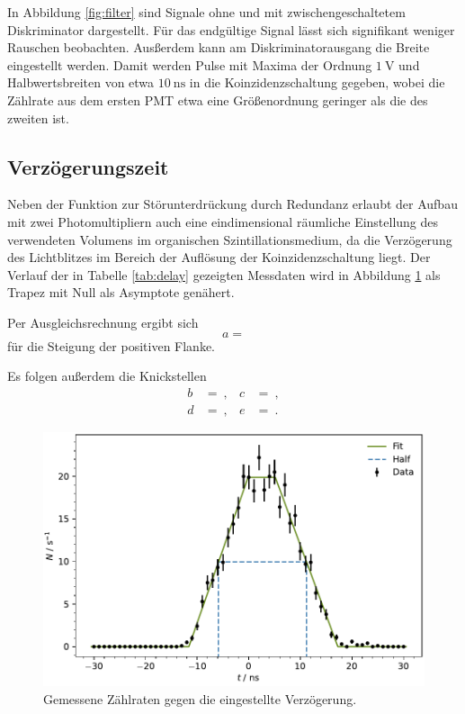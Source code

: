 In Abbildung \ref{fig:filter} sind Signale ohne und mit zwischengeschaltetem Diskriminator dargestellt. Für das endgültige Signal
lässt sich signifikant weniger Rauschen beobachten. Ausßerdem kann am Diskriminatorausgang die Breite eingestellt werden. Damit
werden Pulse mit Maxima der Ordnung $\qty{1}{\volt}$ und Halbwertsbreiten von etwa $\qty{10}{\nano\second}$ in die
Koinzidenzschaltung gegeben, wobei die Zählrate aus dem ersten PMT etwa eine Größenordnung geringer als die des
zweiten ist.



\subsection{Verzögerungszeit}

Neben der Funktion zur Störunterdrückung durch Redundanz erlaubt der Aufbau mit zwei Photomultipliern auch eine eindimensional
räumliche Einstellung des verwendeten Volumens im organischen Szintillationsmedium, da die Verzögerung des Lichtblitzes im Bereich
der Auflösung der Koinzidenzschaltung liegt. Der Verlauf der in Tabelle \ref{tab:delay} gezeigten Messdaten wird in Abbildung
\ref{fig:delay} als Trapez mit Null als Asymptote genähert.

Per Ausgleichsrechnung ergibt sich
\begin{equation*}
	a = 
\end{equation*}
für die Steigung der positiven Flanke.

Es folgen außerdem die Knickstellen
\begin{align*}
	b &=  \: , & c &=  \: , \\
	d &=  \: , & e &=  \: .
\end{align*}

\begin{figure}[H]
	\centering
	\includegraphics[width=\textwidth]{build/delay.pdf}
	\caption{Gemessene Zählraten gegen die eingestellte Verzögerung.}
	\label{fig:delay}
\end{figure}

